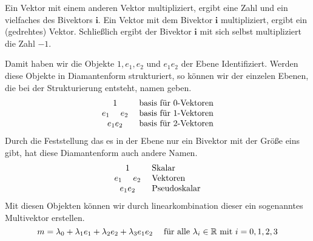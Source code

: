 \documentclass[fleqn]{scrartcl}
\numberwithin{equation}{section}
\def\*#1{\mathbf{#1}}
\begin{document}
Ein Vektor mit einem anderen Vektor multipliziert, ergibt eine Zahl und ein
vielfaches des Bivektors $\*i$. Ein Vektor mit dem Bivektor $\*i$
multipliziert, ergibt ein (gedrehtes) Vektor. Schließlich ergibt der Bivektor
$\*i$ mit sich selbst multipliziert die Zahl $-1$.

Damit haben wir die Objekte $1, e_1, e_2$ und $e_1e_2$ der Ebene
Identifiziert. Werden diese Objekte in Diamantenform strukturiert, so können
wir der einzelen Ebenen, die bei der Strukturierung entsteht, namen geben.
\[
\begin{matrix}
    1 \\ 
    e_1\hspace{3ex} e_2 \\ 
    e_1e_2
\end{matrix}
\hspace{3ex}
\begin{matrix*}[l]
    \textrm{basis für }0\textrm{-Vektoren} \\ 
    \textrm{basis für }1\textrm{-Vektoren} \\ 
    \textrm{basis für }2\textrm{-Vektoren}
\end{matrix*}
\]
Durch die Feststellung das es in der Ebene nur ein Bivektor mit der Größe eins
gibt, hat diese Diamantenform auch andere Namen.
\[
\begin{matrix}
    1 \\ 
    e_1\hspace{3ex} e_2 \\ 
    e_1e_2
\end{matrix}
\hspace{3ex}
\begin{matrix*}[l]
    \textrm{Skalar} \\ 
    \textrm{Vektoren} \\ 
    \textrm{Pseudoskalar}
\end{matrix*}
\]
Mit diesen Objekten können wir durch linearkombination dieser ein sogenanntes
Multivektor erstellen.
\[
    m = \lambda_0 + \lambda_1e_1 + \lambda_2e_2 +
    \lambda_3e_1e_2\hspace{3ex}\textrm{für alle
    }\lambda_i\in\mathbb{R}\textrm{ mit } i=0,1,2,3
\]
\end{document}
